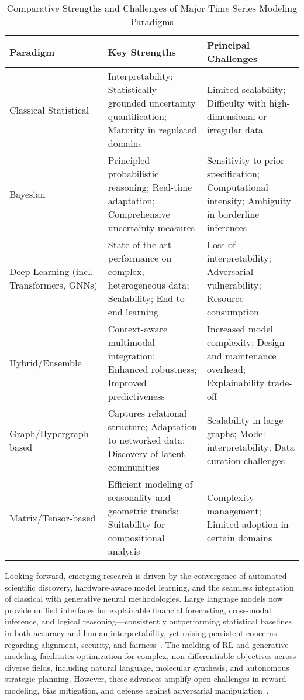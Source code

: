 \begin{table*}[htbp]
\centering
\caption{Comparative Strengths and Challenges of Major Time Series Modeling Paradigms}
\label{tab:paradigm_features}
\begin{adjustbox}{max width=\textwidth}
\begin{tabular}{lll}
\toprule
\textbf{Paradigm} & \textbf{Key Strengths} & \textbf{Principal Challenges} \\
\midrule
Classical Statistical & Interpretability; Statistically grounded uncertainty quantification; Maturity in regulated domains & Limited scalability; Difficulty with high-dimensional or irregular data \\
Bayesian & Principled probabilistic reasoning; Real-time adaptation; Comprehensive uncertainty measures & Sensitivity to prior specification; Computational intensity; Ambiguity in borderline inferences \\
Deep Learning (incl. Transformers, GNNs) & State-of-the-art performance on complex, heterogeneous data; Scalability; End-to-end learning & Loss of interpretability; Adversarial vulnerability; Resource consumption \\
Hybrid/Ensemble & Context-aware multimodal integration; Enhanced robustness; Improved predictiveness & Increased model complexity; Design and maintenance overhead; Explainability trade-off \\
Graph/Hypergraph-based & Captures relational structure; Adaptation to networked data; Discovery of latent communities & Scalability in large graphs; Model interpretability; Data curation challenges \\
Matrix/Tensor-based & Efficient modeling of seasonality and geometric trends; Suitability for compositional analysis & Complexity management; Limited adoption in certain domains \\
\bottomrule
\end{tabular}
\end{adjustbox}
\end{table*}

Looking forward, emerging research is driven by the convergence of automated scientific discovery, hardware-aware model learning, and the seamless integration of classical with generative neural methodologies. Large language models now provide unified interfaces for explainable financial forecasting, cross-modal inference, and logical reasoning—consistently outperforming statistical baselines in both accuracy and human interpretability, yet raising persistent concerns regarding alignment, security, and fairness~\cite{ref11,ref20,ref30}. The melding of RL and generative modeling facilitates optimization for complex, non-differentiable objectives across diverse fields, including natural language, molecular synthesis, and autonomous strategic planning. However, these advances amplify open challenges in reward modeling, bias mitigation, and defense against adversarial manipulation~\cite{ref11,ref31,ref79}.


